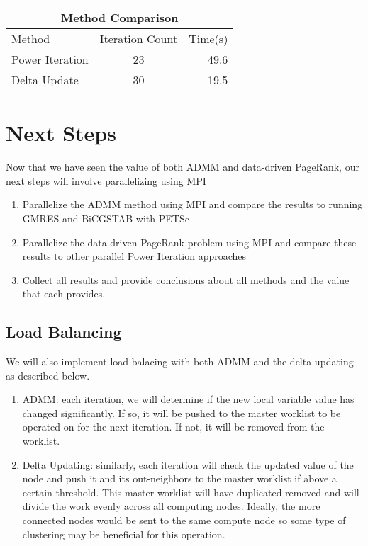 \documentclass[letterpaper,12pt,onecolumn]{article}
\begin{document}
\begin{center}
\begin{tabular}{l || c | r}
	\hline
	\multicolumn{3}{c}{Method Comparison} \\
	\hline\hline
	Method & Iteration Count & Time(s) \\
	\hline\hline
	Power Iteration & 23 & 49.6 \\
	Delta Update & 30 & 19.5 \\
\end{tabular}
\end{center}
\section{Next Steps}

Now that we have seen the value of both ADMM and data-driven PageRank, our next steps will involve parallelizing using MPI

\begin{enumerate}
	\item Parallelize the ADMM method using MPI and compare the results to running GMRES and BiCGSTAB with PETSc
	\item Parallelize the data-driven PageRank problem using MPI and compare these results to other parallel Power Iteration approaches
	\item Collect all results and provide conclusions about all methods and the value that each provides.
\end{enumerate}

\subsection{Load Balancing}
We will also implement load balacing with both ADMM and the delta updating as described below.

\begin{enumerate}
	\item ADMM: each iteration, we will determine if the new local variable value has changed significantly. If so, it will be pushed to the master worklist to be operated on for the next iteration. If not, it will be removed from the worklist.
	\item Delta Updating: similarly, each iteration will check the updated value of the node and push it and its out-neighbors to the master worklist if above a certain threshold. This master worklist will have duplicated removed and will divide the work evenly across all computing nodes. Ideally, the more connected nodes would be sent to the same compute node so some type of clustering may be beneficial for this operation.
\end{enumerate}
\end{document}
